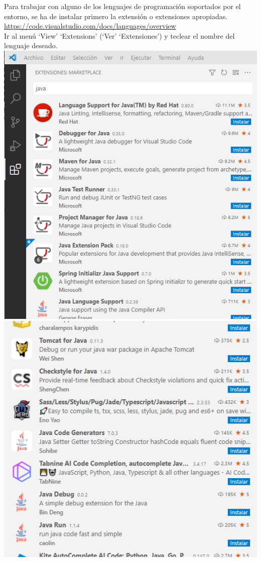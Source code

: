 \documentclass[spanish,12pt,a4paper,final,oneside]{book}
\begin{document}
\vspace{0.5cm}
Para trabajar con alguno de los lenguajes de programación soportados por el entorno, se ha de instalar primero la extensión o extensiones apropiadas.
\\ \url{https://code.visualstudio.com/docs/languages/overview}
\\Ir al menú `View' `Extensions' (`Ver' `Extensiones') y teclear el nombre del lenguaje deseado.
\\\includegraphics[scale=0.4]{VScode - instalar extensiones}
\includegraphics[scale=0.4]{VScode - instalar extensiones II}
\end{document}
